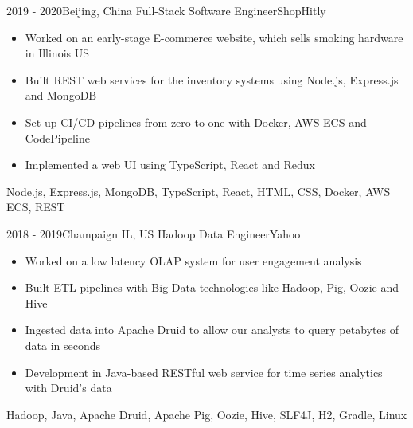\begin{experiences}
\experience
{2019 - 2020}{Beijing, China}
{Full-Stack Software Engineer}{ShopHitly}
{
    \begin{itemize}
    \item Worked on an early-stage E-commerce website, which sells smoking hardware in Illinois US
    \item Built REST web services for the inventory systems using Node.js, Express.js and MongoDB
    \item Set up CI/CD pipelines from zero to one with Docker, AWS ECS and CodePipeline
    \item Implemented a web UI using TypeScript, React and Redux
    \end{itemize}
}
{Node.js, Express.js, MongoDB, TypeScript, React, HTML, CSS, Docker, AWS ECS, REST}

\emptySeparator

\experience
{2018 - 2019}{Champaign IL, US}
{Hadoop Data Engineer}{Yahoo}
{
    \begin{itemize}
    \item Worked on a low latency OLAP system for user engagement analysis
    \item Built ETL pipelines with Big Data technologies like Hadoop, Pig, Oozie and Hive
    \item Ingested data into Apache Druid to allow our analysts to query petabytes of data in seconds
    \item Development in Java-based RESTful web service for time series analytics with Druid's data
    \end{itemize}
}
{Hadoop, Java, Apache Druid, Apache Pig, Oozie, Hive, SLF4J, H2, Gradle, Linux}

\end{experiences}